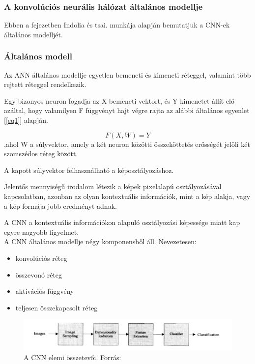 \documentclass[12pt,a4]{article}
\begin{document}
	\subsubsection{A konvolúciós neurális hálózat általános modellje}
    Ebben a fejezetben Indolia és tsai. \cite{CNN} munkája alapján bemutatjuk a CNN-ek általános modelljét.
 
	\subsubsection{Általános modell}
	Az ANN általános modellje egyetlen bemeneti és kimeneti réteggel,
	valamint több rejtett réteggel rendelkezik.
	
	Egy bizonyos 
	neuron fogadja az X bemeneti vektort, és Y kimenetet állít elő azáltal,
	hogy valamilyen F függvényt hajt végre rajta az alábbi általános egyenlet [\ref{eq1}] alapján.
	\begin{mdframed}
	\begin{equation}
    \label{eq1}
			F(X, W) = Y
	\end{equation}
	,ahol W a súlyvektor, amely a két neuron közötti összeköttetés erősségét jelöli két szomszédos réteg között.
 	\end{mdframed}

	A kapott súlyvektor felhasználható a képosztályozáshoz.
	
	Jelentős mennyiségű irodalom létezik a képek pixelalapú osztályozásával
	kapcsolatban, azonban az olyan kontextuális információk, mint a kép alakja, vagy 
	a kép formája jobb eredményt adnak.
	
	A CNN a kontextuális információkon alapuló osztályozási képessége miatt kap egyre nagyobb figyelmet.\\
	
	
	A CNN általános modellje négy komponensből áll. Nevezetesen: 
	\begin{itemize}
		\item konvolúciós réteg
		\item összevonó réteg
		\item aktivációs függvény
		\item teljesen összekapcsolt réteg
	\end{itemize}

    \begin{figure}[h]	
		\centering
		\includegraphics[width=1\linewidth]{element}
		\caption{A CNN elemi összetevői. Forrás: \cite{CNN}}
        \label{fig:cnnelem}
	\end{figure}
 
\end{document}
